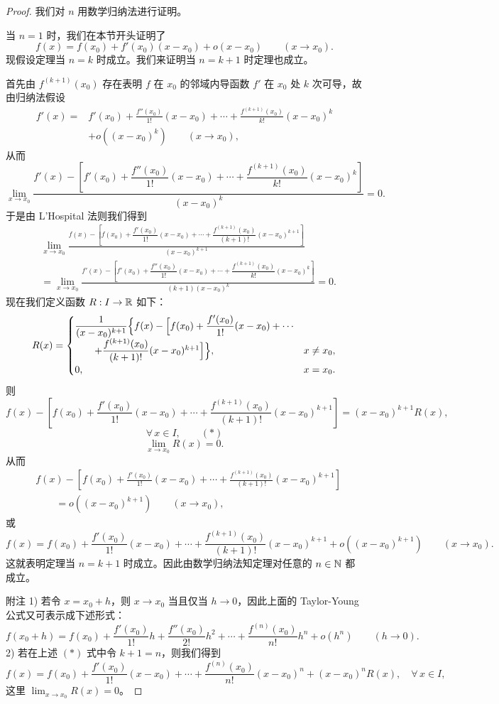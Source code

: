 \begin{proof}

我们对 $n$ 用数学归纳法进行证明。

当 $n=1$ 时，我们在本节开头证明了
\[f(x)=f(x_0)+f'(x_0)(x-x_0)+o(x-x_0)\qquad(x\to x_0).\]
现假设定理当 $n=k$ 时成立。我们来证明当 $n=k+1$ 时定理也成立。

首先由 $f^{(k+1)}(x_0)$ 存在表明 $f$ 在 $x_0$ 的邻域内导函数 $f'$ 在 $x_0$ 处 $k$ 次可导，故由归纳法假设
\[\begin{aligned}
f'(x)={}&f'(x_0)+\frac{f''(x_0)}{1!}(x-x_0)+\cdots+\frac{f^{(k+1)}(x_0)}{k!}(x-x_0)^k\\
&+o((x-x_0)^k)\qquad(x\to x_0),
\end{aligned}\]
从而
\[\lim_{x\to x_0}\frac{f'(x)-\left[f'(x_0)+\dfrac{f''(x_0)}{1!}(x-x_0)+\cdots+\dfrac{f^{(k+1)}(x_0)}{k!}(x-x_0)^k\right]}{(x-x_0)^k}=0.\]
于是由 L'Hospital 法则我们得到
\[\begin{aligned}
&\lim_{x\to x_0}\frac{f(x)-\left[f(x_0)+\dfrac{f'(x_0)}{1!}(x-x_0)+\cdots+\dfrac{f^{(k+1)}(x_0)}{(k+1)!}(x-x_0)^{k+1}\right]}{(x-x_0)^{k+1}}\\
&=\lim_{x\to x_0}\frac{f'(x)-\left[f'(x_0)+\dfrac{f''(x_0)}{1!}(x-x_0)+\cdots+\dfrac{f^{(k+1)}(x_0)}{k!}(x-x_0)^k\right]}{(k+1)(x-x_0)^k}=0.
\end{aligned}\]
现在我们定义函数 $R:I\to\mathbb{R}$ 如下：
\[R(x)=\begin{cases}
\dfrac{1}{(x-x_0)^{k+1}}\Bigl\{f(x)-\Bigl[f(x_0)+\dfrac{f'(x_0)}{1!}(x-x_0)+\cdots\\
\qquad+\dfrac{f^{(k+1)}(x_0)}{(k+1)!}(x-x_0)^{k+1}\Bigr]\Bigr\}, & x\neq x_0,\\[1ex]
0, & x=x_0.
\end{cases}\]
则
\[f(x)-\left[f(x_0)+\frac{f'(x_0)}{1!}(x-x_0)+\cdots+\frac{f^{(k+1)}(x_0)}{(k+1)!}(x-x_0)^{k+1}\right]=(x-x_0)^{k+1}R(x),\]
\[\forall\,x\in I,\qquad(*)\]
\[\lim_{x\to x_0}R(x)=0.\]
从而
\[\begin{aligned}
&f(x)-\left[f(x_0)+\frac{f'(x_0)}{1!}(x-x_0)+\cdots+\frac{f^{(k+1)}(x_0)}{(k+1)!}(x-x_0)^{k+1}\right]\\
&\qquad=o((x-x_0)^{k+1})\qquad(x\to x_0),
\end{aligned}\]
或
\[f(x)=f(x_0)+\frac{f'(x_0)}{1!}(x-x_0)+\cdots+\frac{f^{(k+1)}(x_0)}{(k+1)!}(x-x_0)^{k+1}+o((x-x_0)^{k+1})\qquad(x\to x_0).\]
这就表明定理当 $n=k+1$ 时成立。因此由数学归纳法知定理对任意的 $n\in\mathbb{N}$ 都成立。

附注 1) 若令 $x=x_0+h$，则 $x\to x_0$ 当且仅当 $h\to0$，因此上面的 Taylor-Young 公式又可表示成下述形式：
\[f(x_0+h)=f(x_0)+\frac{f'(x_0)}{1!}h+\frac{f''(x_0)}{2!}h^2+\cdots+\frac{f^{(n)}(x_0)}{n!}h^n+o(h^n)\qquad(h\to0).\]
2) 若在上述 $(*)$ 式中令 $k+1=n$，则我们得到
\[f(x)=f(x_0)+\frac{f'(x_0)}{1!}(x-x_0)+\cdots+\frac{f^{(n)}(x_0)}{n!}(x-x_0)^n+(x-x_0)^nR(x),\quad\forall\,x\in I,\]
这里 $\displaystyle\lim_{x\to x_0}R(x)=0$。


\end{proof}
